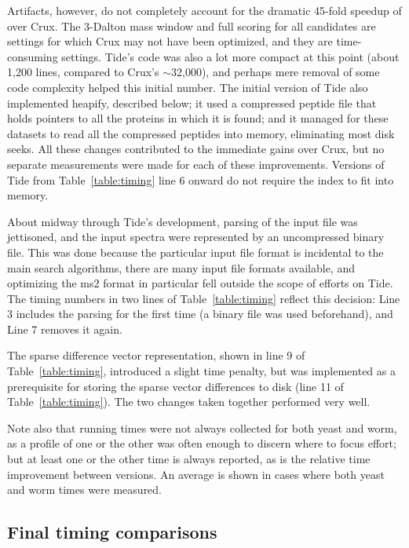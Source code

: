 Artifacts, however, do not completely account for the dramatic 45-fold
speedup of \tidezero over Crux. The 3-Dalton mass window and full
\XCorr scoring for all candidates are settings for which Crux may not
have been optimized, and they are time-consuming settings. Tide's code
was also a lot more compact at this point (about 1,200 lines, compared
to Crux's $\sim$32,000), and perhaps mere removal of some code complexity
helped this initial number. The initial version of Tide also
implemented heapify, described below; it used a compressed peptide
file that holds pointers to all the proteins in which it is found; and
it managed for these datasets to read all the compressed peptides into
memory, eliminating most disk seeks. All these changes contributed to
the immediate gains over Crux, but no separate measurements were made
for each of these improvements. Versions of Tide from
Table~\ref{table:timing} line 6 onward do not require the index to fit
into memory.

About midway through Tide's development, parsing of the input file
was jettisoned, and the input spectra were represented by an
uncompressed binary file. This was done because the particular input
file format is incidental to the main search algorithms, there are
many input file formats available, and optimizing the ms2 format in
particular fell outside the scope of efforts on Tide. The timing
numbers in two lines of Table~\ref{table:timing} reflect this
decision: Line 3 includes the parsing for the first time (a binary
file was used beforehand), and Line 7 removes it again.

The sparse difference vector representation, shown in line 9 of
Table~\ref{table:timing}, introduced a slight time penalty, but was implemented
as a prerequisite for storing the sparse vector differences to disk (line 11 of
Table~\ref{table:timing}). The two changes taken together performed very well.

Note also that running times were not always collected for both yeast
and worm, as a profile of one or the other was often enough to discern
where to focus effort; but at least one or the other time is always
reported, as is the relative time improvement between versions. An
average is shown in cases where both yeast and worm times were
measured.

\subsection{Final timing comparisons}

